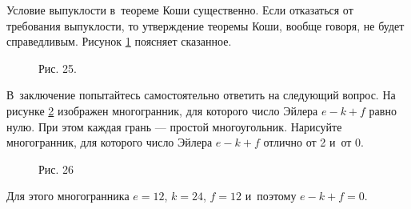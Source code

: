 Условие выпуклости в~теореме Коши существенно. Если отказаться от требования
выпуклости, то утверждение теоремы Коши, вообще говоря, не будет справедливым.
Рисунок \ref{fig:8_3_25} поясняет сказанное.


\begin{figure}\label{fig:8_3_25}
\caption{Рис. 25.}
\end{figure}

В~заключение попытайтесь самостоятельно ответить на следующий вопрос.
На рисунке \ref{fig:8_3_26} изображен многогранник, для которого число Эйлера
$e - k + f$ равно нулю. При этом каждая грань --- простой многоугольник.
Нарисуйте многогранник, для которого число Эйлера $e - k + f$ отлично от 2
и~от 0.

\begin{figure}\label{fig:8_3_26}
\caption{Рис. 26}
\end{figure}

Для этого многогранника $e = 12$, $k = 24$, $f = 12$ и~поэтому $e - k + f = 0$.
